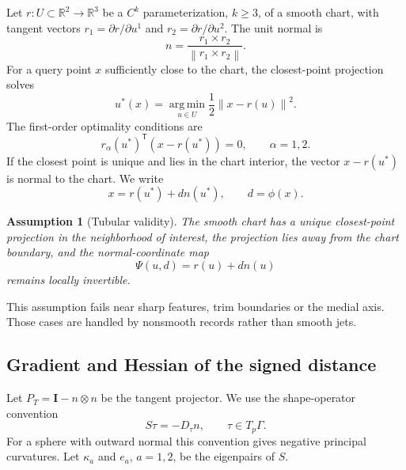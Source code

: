 \documentclass[preprint,12pt,sort&compress]{elsarticle}
\newtheorem{assumption}{Assumption}
\newcommand{\R}{\mathbb{R}}
\newcommand{\argmin}{\operatorname*{arg\,min}}
\newcommand{\norm}[1]{\left\lVert #1 \right\rVert}
\newcommand{\T}{\mathsf{T}}
\newcommand{\Id}{\mathbf{I}}
\begin{document}
Let $r:U\subset\R^2\to\R^3$ be a $C^k$ parameterization, $k\geq 3$, of a smooth chart, with tangent vectors $r_1=\partial r/\partial u^1$ and $r_2=\partial r/\partial u^2$. The unit normal is
\begin{equation}
 n = \frac{r_1\times r_2}{\norm{r_1\times r_2}}.
\end{equation}
For a query point $x$ sufficiently close to the chart, the closest-point projection solves
\begin{equation}
 u^*(x) = \argmin_{u\in U} \frac{1}{2}\norm{x-r(u)}^2.
\label{eq:projection}
\end{equation}
The first-order optimality conditions are
\begin{equation}
 r_\alpha(u^*)^\T\left(x-r(u^*)\right)=0, \qquad \alpha=1,2.
\label{eq:orthogonality}
\end{equation}
If the closest point is unique and lies in the chart interior, the vector $x-r(u^*)$ is normal to the chart. We write
\begin{equation}
 x = r(u^*) + d n(u^*), \qquad d=\phi(x).
\label{eq:normal_coordinate}
\end{equation}

\begin{assumption}[Tubular validity]
\label{ass:tubular}
The smooth chart has a unique closest-point projection in the neighborhood of interest, the projection lies away from the chart boundary, and the normal-coordinate map
\begin{equation}
 \Psi(u,d)=r(u)+d n(u)
\end{equation}
remains locally invertible.
\end{assumption}

This assumption fails near sharp features, trim boundaries or the medial axis. Those cases are handled by nonsmooth records rather than smooth jets.

\subsection{Gradient and Hessian of the signed distance}

Let $P_T=\Id-n\otimes n$ be the tangent projector. We use the shape-operator convention
\begin{equation}
 S\tau = -D_\tau n, \qquad \tau\in T_p\Gamma.
\label{eq:shape_operator}
\end{equation}
For a sphere with outward normal this convention gives negative principal curvatures. Let $\kappa_a$ and $e_a$, $a=1,2$, be the eigenpairs of $S$.
\end{document}

